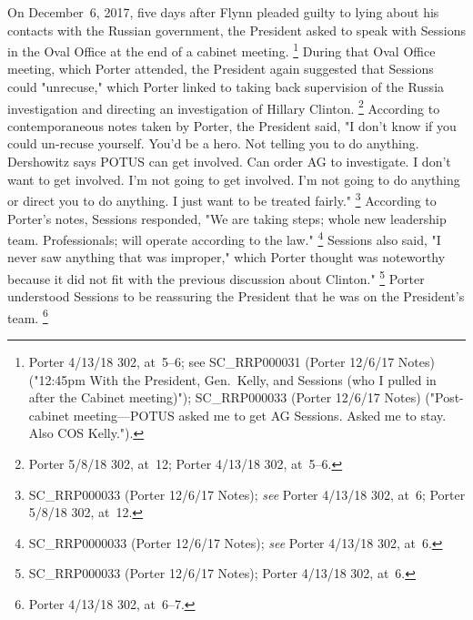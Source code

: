 On December~6, 2017, five days after Flynn pleaded guilty to lying about his contacts with the Russian government, the President asked to speak with Sessions in the Oval Office at the end of a cabinet meeting.%
\footnote{Porter 4/13/18 302, at~5--6;
see SC\_RRP000031 (Porter 12/6/17 Notes) ("12:45pm With the President, Gen.~Kelly, and Sessions (who I pulled in after the Cabinet meeting)");
SC\_RRP000033 (Porter 12/6/17 Notes) ("Post-cabinet meeting---POTUS asked me to get AG Sessions.
Asked me to stay.
Also COS Kelly.").}
During that Oval Office meeting, which Porter attended, the President again suggested that Sessions could "unrecuse," which Porter linked to taking back supervision of the Russia investigation and directing an investigation of Hillary Clinton.%
\footnote{Porter 5/8/18 302, at~12;
Porter 4/13/18 302, at~5--6.}
According to contemporaneous notes taken by Porter, the President said, "I don't know if you could un-recuse yourself.
You'd be a hero.
Not telling you to do anything.
Dershowitz says POTUS can get involved.
Can order AG to investigate.
I don't want to get involved.
I'm not going to get involved.
I'm not going to do anything or direct you to do anything.
I just want to be treated fairly."%
\footnote{SC\_RRP000033 (Porter 12/6/17 Notes);
\textit{see} Porter 4/13/18 302, at~6;
Porter 5/8/18 302, at~12.}
According to Porter's notes, Sessions responded, "We are taking steps; whole new leadership team.
Professionals; will operate according to the law."%
\footnote{SC\_RRP0000033 (Porter 12/6/17 Notes);
\textit{see} Porter 4/13/18 302, at~6.}
Sessions also said, "I never saw anything that was improper," which Porter thought was noteworthy because it did not fit with the previous discussion about Clinton."%
\footnote{SC\_RRP000033 (Porter 12/6/17 Notes);
Porter 4/13/18 302, at~6.}
Porter understood Sessions to be reassuring the President that he was on the President's team.%
\footnote{Porter 4/13/18 302, at~6--7.}

